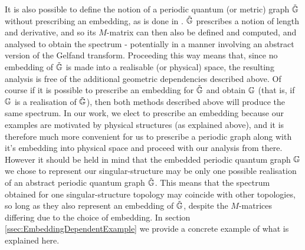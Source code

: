It is also possible to define the notion of a periodic quantum (or metric) graph $\tilde{\mathbb{G}}$ without prescribing an embedding, as is done in \cite[Chapter~4]{berkolaiko2013introduction}.
$\tilde{\mathbb{G}}$ prescribes a notion of length and derivative, and so its $M$-matrix can then also be defined and computed, and analysed to obtain the spectrum - potentially in a manner involving an abstract version of the Gelfand transform.
Proceeding this way means that, since no embedding of $\tilde{\mathbb{G}}$ is made into a realisable (or physical) space, the resulting analysis is free of the additional geometric dependencies described above.
Of course if it is possible to prescribe an embedding for $\tilde{\mathbb{G}}$ and obtain $\mathbb{G}$ (that is, if $\mathbb{G}$ is a realisation of $\tilde{\mathbb{G}}$), then both methods described above will produce the same spectrum.
In our work, we elect to prescribe an embedding because our examples are motivated by physical structures (as explained above), and it is therefore much more convenient for us to prescribe a periodic graph along with it's embedding into physical space and proceed with our analysis from there.
However it should be held in mind that the embedded periodic quantum graph $\mathbb{G}$ we chose to represent our singular-structure may be only one possible realisation of an abstract periodic quantum graph $\tilde{\mathbb{G}}$.
This means that the spectrum obtained for one singular-structure topology may coincide with other topologies, so long as they also represent an embedding of $\tilde{\mathbb{G}}$, despite the $M$-matrices differing due to the choice of embedding.
In section \ref{ssec:EmbeddingDependentExample} we provide a concrete example of what is explained here.